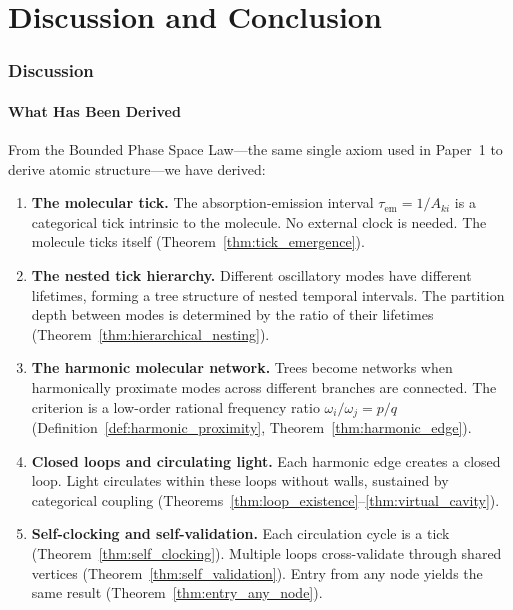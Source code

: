 \documentclass[11pt,a4paper]{article}
\theoremstyle{definition}
\theoremstyle{remark}
\newcommand{\tem}{\tau_{\mathrm{em}}}
\newcommand{\Aki}{A_{ki}}
\begin{document}

\part{Discussion and Conclusion}

\section{Discussion}
\label{sec:discussion}

\subsection{What Has Been Derived}

From the Bounded Phase Space Law---the same single axiom used in Paper~1 \citep{sachikonye2025a} to derive atomic structure---we have derived:

\begin{enumerate}
\item \textbf{The molecular tick.} The absorption-emission interval $\tem = 1/\Aki$ is a categorical tick intrinsic to the molecule. No external clock is needed. The molecule ticks itself (Theorem~\ref{thm:tick_emergence}).

\item \textbf{The nested tick hierarchy.} Different oscillatory modes have different lifetimes, forming a tree structure of nested temporal intervals. The partition depth between modes is determined by the ratio of their lifetimes (Theorem~\ref{thm:hierarchical_nesting}).

\item \textbf{The harmonic molecular network.} Trees become networks when harmonically proximate modes across different branches are connected. The criterion is a low-order rational frequency ratio $\omega_i/\omega_j = p/q$ (Definition~\ref{def:harmonic_proximity}, Theorem~\ref{thm:harmonic_edge}).

\item \textbf{Closed loops and circulating light.} Each harmonic edge creates a closed loop. Light circulates within these loops without walls, sustained by categorical coupling (Theorems~\ref{thm:loop_existence}--\ref{thm:virtual_cavity}).

\item \textbf{Self-clocking and self-validation.} Each circulation cycle is a tick (Theorem~\ref{thm:self_clocking}). Multiple loops cross-validate through shared vertices (Theorem~\ref{thm:self_validation}). Entry from any node yields the same result (Theorem~\ref{thm:entry_any_node}).
\end{enumerate}
\end{document}
